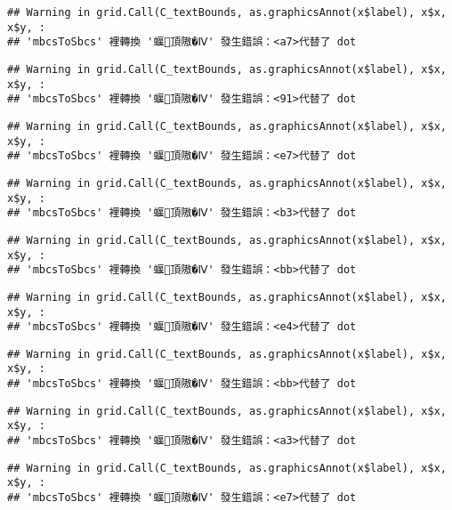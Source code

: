 \documentclass[
]{article}
\begin{document}
\begin{verbatim}
## Warning in grid.Call(C_textBounds, as.graphicsAnnot(x$label), x$x, x$y, :
## 'mbcsToSbcs' 裡轉換 '蝘頂隞�Ⅳ' 發生錯誤：<a7>代替了 dot
\end{verbatim}

\begin{verbatim}
## Warning in grid.Call(C_textBounds, as.graphicsAnnot(x$label), x$x, x$y, :
## 'mbcsToSbcs' 裡轉換 '蝘頂隞�Ⅳ' 發生錯誤：<91>代替了 dot
\end{verbatim}

\begin{verbatim}
## Warning in grid.Call(C_textBounds, as.graphicsAnnot(x$label), x$x, x$y, :
## 'mbcsToSbcs' 裡轉換 '蝘頂隞�Ⅳ' 發生錯誤：<e7>代替了 dot
\end{verbatim}

\begin{verbatim}
## Warning in grid.Call(C_textBounds, as.graphicsAnnot(x$label), x$x, x$y, :
## 'mbcsToSbcs' 裡轉換 '蝘頂隞�Ⅳ' 發生錯誤：<b3>代替了 dot
\end{verbatim}

\begin{verbatim}
## Warning in grid.Call(C_textBounds, as.graphicsAnnot(x$label), x$x, x$y, :
## 'mbcsToSbcs' 裡轉換 '蝘頂隞�Ⅳ' 發生錯誤：<bb>代替了 dot
\end{verbatim}

\begin{verbatim}
## Warning in grid.Call(C_textBounds, as.graphicsAnnot(x$label), x$x, x$y, :
## 'mbcsToSbcs' 裡轉換 '蝘頂隞�Ⅳ' 發生錯誤：<e4>代替了 dot
\end{verbatim}

\begin{verbatim}
## Warning in grid.Call(C_textBounds, as.graphicsAnnot(x$label), x$x, x$y, :
## 'mbcsToSbcs' 裡轉換 '蝘頂隞�Ⅳ' 發生錯誤：<bb>代替了 dot
\end{verbatim}

\begin{verbatim}
## Warning in grid.Call(C_textBounds, as.graphicsAnnot(x$label), x$x, x$y, :
## 'mbcsToSbcs' 裡轉換 '蝘頂隞�Ⅳ' 發生錯誤：<a3>代替了 dot
\end{verbatim}

\begin{verbatim}
## Warning in grid.Call(C_textBounds, as.graphicsAnnot(x$label), x$x, x$y, :
## 'mbcsToSbcs' 裡轉換 '蝘頂隞�Ⅳ' 發生錯誤：<e7>代替了 dot
\end{verbatim}
\end{document}
